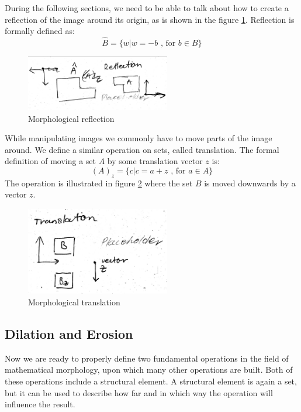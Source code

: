 \documentclass[
  digital,     %
  oneside,     %
  nosansbold,  %
  nocolorbold, %
  lof,         %
  lot,         %
]{fithesis4}
\begin{document}
During the following sections, we need to be able to talk about how to create a
reflection of the image around its origin, as is shown in the figure
\ref{fig:morp_refl}. Reflection is formally defined as: 
$$\hat{B} = \{w | w=-b \text{ , for } b \in B\}$$
\begin{figure}
    \begin{center}
        \includegraphics[width=6.3cm]{resources/morph_reflection.jpg}
    \end{center}
    \caption{Morphological reflection} %
    \label{fig:morp_refl}
\end{figure}

While manipulating images we commonly have to move parts of the image around. We
define a similar operation on sets, called translation. The formal definition of
moving a set $A$ by some translation vector $z$ is:
$$(A)_z = \{c | c = a + z\text{ , for } a \in A\}$$
The operation is illustrated in figure \ref{fig:morph_translation} where the set
$B$ is moved downwards by a vector $z$.
\begin{figure}
    \begin{center}
        \includegraphics[width=6.3cm]{resources/morph_translation.jpg}
    \end{center}
    \caption{Morphological translation} %
    \label{fig:morph_translation}
\end{figure}

\subsection{Dilation and Erosion}
Now we are ready to properly define two fundamental operations in the field of
mathematical morphology, upon which many other operations are built. Both of
these operations include a structural element. A structural element is again a
set, but it can be used to describe how far and in which way the operation will influence the result.
\end{document}
